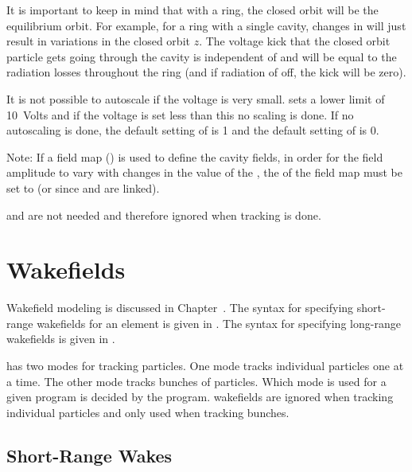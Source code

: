 It is important to keep in mind that with a ring, the closed orbit will be the equilibrium
orbit. For example, for a ring with a single cavity, changes in  will just result in
variations in the closed orbit $z$. The voltage kick that the closed orbit particle gets going
through the cavity is independent of  and will be equal to the radiation losses throughout
the ring (and if radiation of off, the kick will be zero).

It is not possible to autoscale if the voltage is very small. \bmad sets a lower limit of 10~Volts
and if the voltage is set less than this no scaling is done. If no autoscaling is done, the default
setting of  is 1 and the default setting of  is 0.

Note: If a field map () is used to define the cavity fields, in order for the
field amplitude to vary with changes in the value of the , the  of
the field map must be set to  (or  since  and 
are linked).

 and  are not needed and therefore ignored when
 tracking is done.

\section{Wakefields}
\label{s:wakes}

Wakefield modeling is discussed in Chapter~. The syntax for specifying
short-range wakefields for an element is given in . The syntax for specifying
long-range wakefields is given in .

\bmad has two modes for tracking particles. One mode tracks individual particles one at a time. The
other mode tracks bunches of particles. Which mode is used for a given program is decided by the
program. wakefields are ignored when tracking individual particles and only used when tracking
bunches.

\subsection{Short-Range Wakes}
\label{s:sr.wake.syntax}


